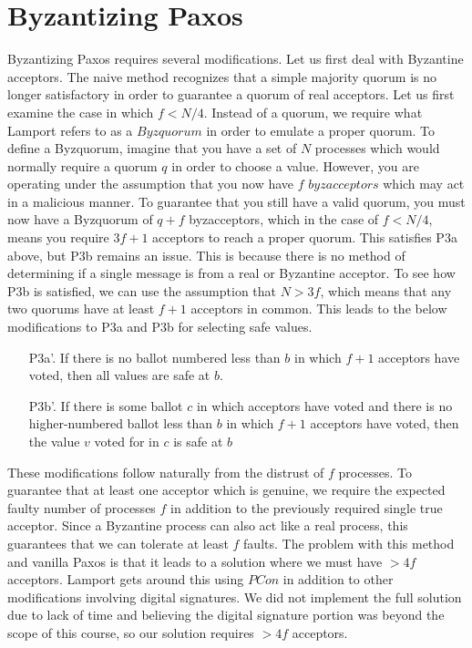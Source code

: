 \documentclass[conference]{IEEEtran}
\begin{document}
\section{Byzantizing Paxos}
Byzantizing Paxos requires several modifications. Let us first deal with Byzantine acceptors.
The naive method recognizes that a simple majority quorum is no longer satisfactory in order to guarantee a quorum of real acceptors. Let us first examine the case in which $f < N/4$. Instead of a quorum, we require what Lamport refers to as a $Byzquorum$ in order to emulate a proper quorum. To define a Byzquorum, imagine that you have a set of $N$ processes which would normally require a quorum $q$ in order to choose a value. However, you are operating under the assumption that you now have $f$ $byzacceptors$ which may act in a malicious manner. To guarantee that you still have a valid quorum, you must now have a Byzquorum of $q + f$ byzacceptors, which in the case of $f < N/4$, means you require $3f + 1$ acceptors to reach a proper quorum.
This satisfies P3a above, but P3b remains an issue. This is because there is no method of determining if a single message is from a real or Byzantine acceptor. To see how P3b is satisfied, we can use the assumption that $N > 3f$, which means that any two quorums have at least $f + 1$ acceptors in common. This leads to the below modifications to P3a and P3b for selecting safe values.
\smallskip
\begin{enumerate}[leftmargin=4em]
\item[P3a'.] If there is no ballot numbered less than $b$ in which $f + 1$ acceptors have voted, then all values are safe at $b$.
\item[P3b'.] If there is some ballot $c$ in which acceptors have voted and there is no higher-numbered ballot less than $b$ in which $f + 1$ acceptors have voted, then the value $v$ voted for in $c$ is safe at $b$
\end{enumerate}
\smallskip

These modifications follow naturally from the distrust of $f$ processes. To guarantee that at least one acceptor which is genuine, we require the expected faulty number of processes $f$ in addition to the previously required single true acceptor. Since a Byzantine process can also act like a real process, this guarantees that we can tolerate at least $f$ faults. The problem with this method and vanilla Paxos is that it leads to a solution where we must have $>4f$ acceptors. Lamport gets around this using $PCon$ in addition to other modifications involving digital signatures. We did not implement the full solution due to lack of time and believing the digital signature portion was beyond the scope of this course, so our solution requires $> 4f$ acceptors.
\end{document}
